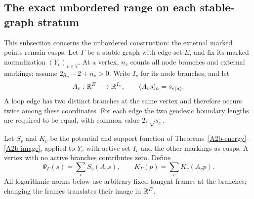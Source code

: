 \subsection{The exact unbordered range on each stable-graph stratum}
\label{sec:A1-range}

This subsection concerns the unbordered construction: the external
marked points remain cusps. Let $\Gamma$ be a stable graph with edge
set $E$, and fix its marked normalization $(Y_v)_{v\in V}$.
At a vertex, $n_v$ counts all node branches and external markings;
assume $2g_v-2+n_v>0$. Write $I_v$ for its node branches, and let
\[
 A_v:{\mathbb{R}}^E\longrightarrow{\ensuremath{\mathbb{R}}}^{I_v},\qquad
 (A_vs)_a=s_{e(a)}.
\]
A loop edge has two distinct branches at the same vertex and therefore
occurs twice among these coordinates. For each edge the two geodesic
boundary lengths are required to be equal, with common value
$2\pi\sqrt{s_e}$.

Let $S_v$ and $K_v$ be the potential and support function of
Theorems~\ref{A2b-energy}--\ref{A2b-image}, applied to $Y_v$ with
active set $I_v$ and the other markings as cusps. A vertex with no
active branches contributes zero. Define
\begin{equation}\label{A1-graph-potential}
 \Psi_\Gamma(s)=\sum_v S_v(A_vs),\qquad
 K_\Gamma(p)=\sum_v K_v(A_vp).
\end{equation}
All logarithmic norms below use arbitrary fixed tangent frames at the
branches; changing the frames translates their image in ${\mathbb{R}}^E$.

